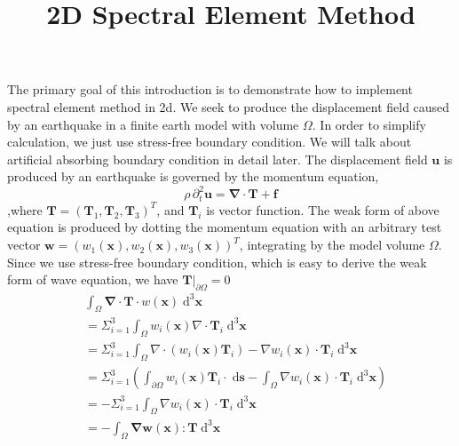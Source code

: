 \documentclass{book}
\title{2D Spectral Element Method}
\begin{document}
  The primary goal of this introduction is to demonstrate how to implement spectral element method in 2d. We seek to produce the displacement field caused by an earthquake in a finite earth model with volume $\Omega$. In order to simplify calculation, we just use stress-free boundary condition.  We will  talk about artificial absorbing  boundary condition in detail later.
  The displacement field $\boldsymbol{u}$ is produced by an earthquake is governed by the momentum equation,
  \begin{equation}
  \rho\,\partial_t^2\boldsymbol{u}=\boldsymbol{\nabla}\cdot\boldsymbol{T}+\boldsymbol{f}
  \end{equation}
  ,where $\boldsymbol T =(\boldsymbol T_1,\boldsymbol T_2,\boldsymbol T_3)^T$, and $\boldsymbol T_i$ is vector function.
  The weak form of above equation is produced by dotting the momentum equation with an arbitrary test vector $\boldsymbol{w}=(w_1(\boldsymbol x),w_2(\boldsymbol x),w_3(\boldsymbol x))^T $, integrating by the model volume $\Omega$. Since we use stress-free boundary condition, which is easy to derive the weak form of wave equation, we have $\boldsymbol T|_{\partial \Omega} = 0$
  \begin{equation}
  \begin{aligned}
  &\int_\Omega \boldsymbol{\nabla}\cdot\boldsymbol{T}\cdot w(\boldsymbol{x})\;\mathrm{d}^3\boldsymbol{x}\\
  & = \Sigma _{i=1}^3\int_\Omega w_i(\boldsymbol{x})\nabla\cdot\boldsymbol{T}_i\;\mathrm{d}^3\boldsymbol{x}\\
  & = \Sigma_{i=1}^3\int_\Omega \nabla\cdot(w_i(\boldsymbol{x})\boldsymbol{T}_i) - \nabla w_i(\boldsymbol x) \cdot\boldsymbol T_i\;\mathrm{d}^3\boldsymbol{x}\\
  & = \Sigma_{i=1}^3\left(\int_{\partial\Omega} w_i(\boldsymbol{x})\boldsymbol T_i \cdot \;\mathrm{d}\boldsymbol{s}-\int_\Omega\nabla w_i(\boldsymbol x) \cdot\boldsymbol T_i\;\mathrm{d}^3\boldsymbol{x} \right)\\
  & = -\Sigma_{i=1}^3\int_\Omega\nabla w_i(\boldsymbol x) \cdot\boldsymbol T_i\;\mathrm{d}^3\boldsymbol{x}\\
  & = -\int_\Omega \boldsymbol{\nabla}\boldsymbol w(\boldsymbol x): \boldsymbol T\;\mathrm{d}^3\boldsymbol x
  \end{aligned}
  \end{equation}
\end{document}
